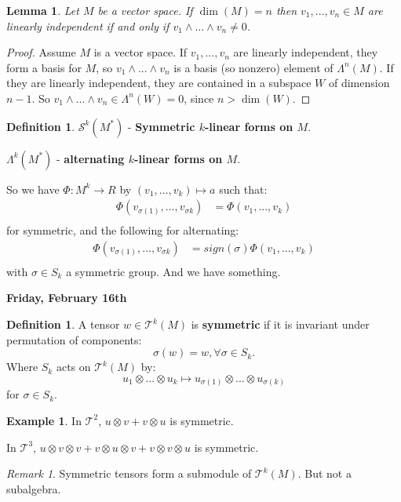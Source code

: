 \documentclass[9pt,reqno,twoside]{amsbook}
\theoremstyle{plain}
\numberwithin{section}{chapter}
\numberwithin{equation}{chapter}
\newtheorem{lem}[theorem]{Lemma}
\theoremstyle{definition}
\newtheorem{Def}[theorem]{Definition}
\newtheorem{Ex}[theorem]{Example}
\theoremstyle{remark}
\newtheorem{rem}[theorem]{Remark}
\theoremstyle{plain}
\newcommand{\bb}{\vspace{3mm}}
\newcommand{\mc}{\mathcal}
\newcommand{\bee}{\begin{equation}\begin{aligned}}
\newcommand{\eee}{\end{aligned}\end{equation}}
\newcommand{\tens}{\otimes}
\begin{document}
 \begin{lem}
Let $M$ be a vector space.  If $\dim(M) = n$ then $v_1,...,v_n \in M$ are linearly independent if and only if $v_1 \wedge ... \wedge v_n \neq 0$. 
 \end{lem}
 
 \begin{proof}
 Assume $M$ is a vector space. If $v_1,...,v_n$ are linearly independent, they form a basis for $M$, so $v_1 \wedge ...\wedge v_n$ is a basis (so nonzero) element of $\Lambda^n(M)$. If they are linearly independent, they are contained in a subspace $W$ of dimension $n - 1$. So $v_1 \wedge ... \wedge v_n \in \Lambda^n(W) = 0$, since $n > \dim(W)$. 
 \end{proof}
 
\begin{Def}

$
\mc{S}^k(M^*)
$ - \textbf{Symmetric $k$-linear forms on $M$}. 

\bb
$
\Lambda^k(M^*)
$ - \textbf{alternating $k$-linear forms on $M$}. 
\end{Def}

So we have $\Phi:M^k \to R$ by $(v_1,...,v_k) \mapsto a$ such that:
\bee
\Phi(v_{\sigma(1)},...,v_{\sigma{k}}) &= \Phi(v_1,...,v_k)\\
\eee
for symmetric, and the following for alternating:
\bee
\Phi(v_{\sigma(1)},...,v_{\sigma{k}}) &= sign(\sigma)\Phi(v_1,...,v_k)\\
\eee
with $\sigma \in S_k$ a symmetric group. 
And we have something. 
\bb
\bb

\textbf{Friday, February 16th}

\begin{Def}
A tensor $w \in \mc{T}^k(M)$ is \textbf{symmetric} if it is invariant under permutation of components: 
$$
\sigma(w) = w, \forall \sigma \in S_k.
$$
Where $S_k$ acts on $\mathcal{T}^k(M)$ by:
$$
u_1 \tens ...\tens u_k \mapsto u_{\sigma(1)} \tens ... \tens u_{\sigma(k)}
$$
for $\sigma \in S_k$. 
\end{Def}

\begin{Ex}
In $\mc{T}^2$, $u \tens v + v \tens u$ is symmetric. 
\bb

In $\mc{T}^3$, $u \tens v \tens v + v \tens u \tens v + v \tens v \tens u$ is symmetric. 
\end{Ex}

\begin{rem}
Symmetric tensors form a submodule of $\mc{T}^k(M)$. But not a subalgebra. 
\end{rem}
\end{document}
